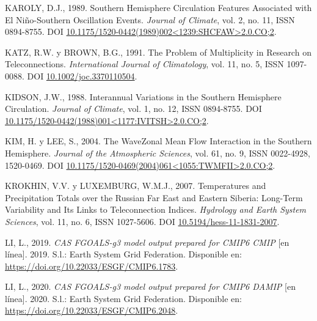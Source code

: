 \documentclass[12pt,oneside,a4paper]{reedthesis}
\newlength{\cslhangindent}
\newenvironment{CSLReferences}[2] %
 {%
  \setlength{\parindent}{0pt}
  \ifodd #1 \everypar{\setlength{\hangindent}{\cslhangindent}}\ignorespaces\fi
  \ifnum #2 > 0
  \setlength{\parskip}{#2\baselineskip}
  \fi
 }%
 {}
\begin{document}
\begin{CSLReferences}{1}{0}
\leavevmode{}%
KAROLY, D.J., 1989. Southern {Hemisphere Circulation Features Associated} with {El Ni{ñ}o-Southern Oscillation Events}. \emph{Journal of Climate}, vol. 2, no. 11, ISSN 0894-8755. DOI \href{https://doi.org/10.1175/1520-0442(1989)002\%3C1239:SHCFAW\%3E2.0.CO;2}{10.1175/1520-0442(1989)002\textless1239:SHCFAW\textgreater2.0.CO;2}.

\leavevmode{}%
KATZ, R.W. y BROWN, B.G., 1991. The Problem of Multiplicity in Research on Teleconnections. \emph{International Journal of Climatology}, vol. 11, no. 5, ISSN 1097-0088. DOI \href{https://doi.org/10.1002/joc.3370110504}{10.1002/joc.3370110504}.

\leavevmode{}%
KIDSON, J.W., 1988. Interannual {Variations} in the {Southern Hemisphere Circulation}. \emph{Journal of Climate}, vol. 1, no. 12, ISSN 0894-8755. DOI \href{https://doi.org/10.1175/1520-0442(1988)001\%3C1177:IVITSH\%3E2.0.CO;2}{10.1175/1520-0442(1988)001\textless1177:IVITSH\textgreater2.0.CO;2}.

\leavevmode{}%
KIM, H. y LEE, S., 2004. The {Wave}{\textendash}{Zonal Mean Flow Interaction} in the {Southern Hemisphere}. \emph{Journal of the Atmospheric Sciences}, vol. 61, no. 9, ISSN 0022-4928, 1520-0469. DOI \href{https://doi.org/10.1175/1520-0469(2004)061\%3C1055:TWMFII\%3E2.0.CO;2}{10.1175/1520-0469(2004)061\textless1055:TWMFII\textgreater2.0.CO;2}.

\leavevmode{}%
KROKHIN, V.V. y LUXEMBURG, W.M.J., 2007. Temperatures and Precipitation Totals over the {Russian Far East} and {Eastern Siberia}: Long-Term Variability and Its Links to Teleconnection Indices. \emph{Hydrology and Earth System Sciences}, vol. 11, no. 6, ISSN 1027-5606. DOI \href{https://doi.org/10.5194/hess-11-1831-2007}{10.5194/hess-11-1831-2007}.

\leavevmode{}%
LI, L., 2019. \emph{CAS FGOALS-g3 model output prepared for CMIP6 CMIP} {[}en línea{]}. 2019. S.l.: Earth System Grid Federation. Disponible en: \url{https://doi.org/10.22033/ESGF/CMIP6.1783}.

\leavevmode{}%
LI, L., 2020. \emph{CAS FGOALS-g3 model output prepared for CMIP6 DAMIP} {[}en línea{]}. 2020. S.l.: Earth System Grid Federation. Disponible en: \url{https://doi.org/10.22033/ESGF/CMIP6.2048}.


\end{CSLReferences}
\end{document}
